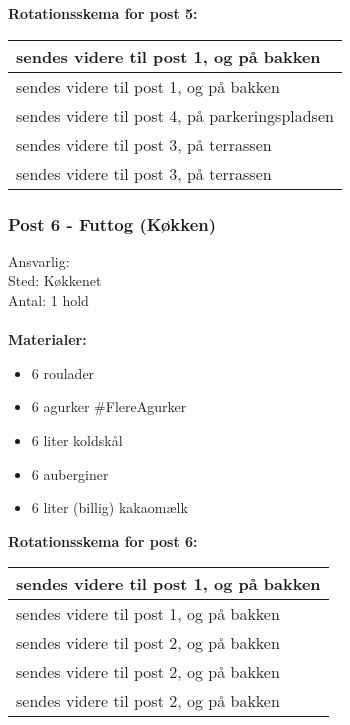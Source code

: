 \textbf{Rotationsskema for post 5:}\\
\begin{tabular}{ | l | }
\hline
	 \Bad sendes videre til post 1, \Lucyfar og \Gabriel på bakken \\ \hline
	 \Fransk sendes videre til post 1, \Lucyfar og \Gabriel på bakken \\ \hline
	 \Norder sendes videre til post 4, \Johnny på parkeringspladsen \\ \hline
	 \Alternative sendes videre til post 3, \Ora på terrassen \\ \hline
	 \Hippier sendes videre til post 3, \Ora på terrassen \\ \hline
\end{tabular}

\newpage

\subsubsection{Post 6 - Futtog (Køkken)}
Ansvarlig: \Hyttebombz{}\\
Sted: Køkkenet\\
Antal: 1 hold\\\\
\textbf{Materialer:}
\begin{multicols}{2}
\begin{itemize}
  \item 6 roulader
  \item 6 agurker \#FlereAgurker
  \item 6 liter koldskål
  \item 6 auberginer
  \item 6 liter (billig) kakaomælk
\end{itemize}
\end{multicols}

\textbf{Rotationsskema for post 6:}\\
\begin{tabular}{ | l | }
\hline
	 \Poppere sendes videre til post 1, \Lucyfar og \Gabriel på bakken \\ \hline
	 \Alternative sendes videre til post 1, \Lucyfar og \Gabriel på bakken \\ \hline
	 \Hippier sendes videre til post 2, \Lucyfar og \Gabriel på bakken \\ \hline
	 \Fransk  sendes videre til post 2, \Lucyfar og \Gabriel på bakken \\ \hline
	 \Bad sendes videre til post 2, \Lucyfar og \Gabriel på bakken \\ \hline
\end{tabular}



